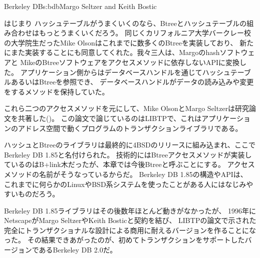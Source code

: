 \begin{aosachapter}{Berkeley DB}{s:bdb}{Margo Seltzer and Keith Bostic}
\begin{aosasect1}{はじまり}
ハッシュテーブルがうまくいくのなら、Btreeとハッシュテーブルの組み合わせはもっとうまくいくだろう。
同じくカリフォルニア大学バークレー校の大学院生だったMike Olsonはこれまでに数多くのBtreeを実装しており、
新たにまた実装することにも同意してくれた。我々三人は、Margoのhashソフトウェアと
MikeのBtreeソフトウェアをアクセスメソッドに依存しないAPIに変換した。
アプリケーション側からはデータベースハンドルを通じてハッシュテーブルあるいはBtreeを参照でき、
データベースハンドルがデータの読み込みや変更をするメソッドを保持していた。

これら二つのアクセスメソッドを元にして、Mike OlsonとMargo Seltzerは研究論文を共著した(\cite{bib:seltzer:libtp})。
この論文で論じているのはLIBTPで、これはアプリケーションのアドレス空間で動くプログラムのトランザクションライブラリである。

ハッシュとBtreeのライブラリは最終的に4BSDのリリースに組み込まれ、ここでBerkeley DB 1.85と名付けられた。
技術的にはBtreeアクセスメソッドが実装しているのはB+link木だったが、本章では今後Btreeと呼ぶことにする。
アクセスメソッドの名前がそうなっているからだ。
Berkeley DB 1.85の構造やAPIは、
これまでに何らかのLinuxやBSD系システムを使ったことがある人にはなじみやすいものだろう。

Berkeley DB 1.85ライブラリはその後数年ほとんど動きがなかったが、
1996年にNetscapeがMargo SeltzerやKeith Bosticと契約を結び、
LIBTPの論文で示された完全にトランザクショナルな設計による商用に耐えるバージョンを作ることになった。
その結果できあがったのが、初めてトランザクションをサポートしたバージョンであるBerkeley DB 2.0だ。


\end{aosasect1}
\end{aosachapter}

